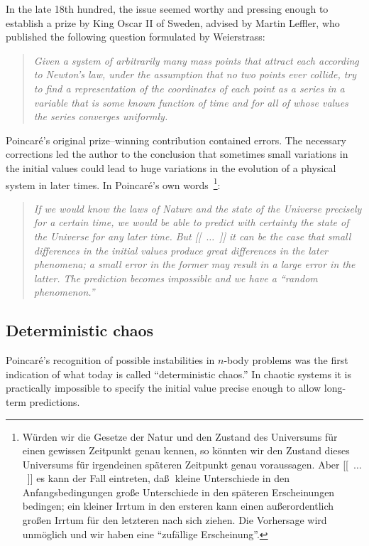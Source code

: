 \documentclass[rmp,amsfonts,showpacs,showkeys,twocolumn]{revtex4}
\begin{document}
In the late 18th hundred,
the issue seemed worthy and pressing enough to establish a prize by
King Oscar II of Sweden, advised by Martin Leffler, who published the following
question formulated by Weierstrass:
\begin{quote}
{\em
Given a system of arbitrarily many mass points that attract each
according to Newton's law, under the assumption that no two points ever collide,
try to find a representation of the coordinates of each point
as a series in a variable that is some known function of time and for
all of whose values the series converges uniformly.
}
\end{quote}
Poincar{\'e}'s original prize--winning contribution contained errors.
The necessary corrections led the author to the conclusion that sometimes small
variations in the initial values could lead to huge variations in the
evolution of a physical system in later times.
In Poincar{\'e}'s own words~\cite[Chapter 4, Sect. II, pp. 56-57]{poincare14}\footnote{
W\"urden wir die Gesetze der Natur und den Zustand des Universums
f\"ur einen gewissen Zeitpunkt genau kennen, so
k\"onnten wir den Zustand dieses Universums f\"ur
irgendeinen sp\"ateren Zeitpunkt genau voraussagen.
Aber
[[~$\ldots$~]]
 es kann der Fall eintreten,
da\ss $\;$ kleine Unterschiede in den Anfangsbedingungen
gro\ss e Unterschiede in den sp\"ateren Erscheinungen bedingen;
ein kleiner Irrtum in den ersteren kann einen au\ss erordentlich gro\ss en
Irrtum f\"ur den letzteren nach sich ziehen.
Die Vorhersage wird unm\"oglich und wir haben eine
``zuf\"allige Erscheinung''.}:
\begin{quote}
{\em
If we would know the laws of Nature and the state of the Universe precisely
for a certain time,
we would be able to predict with certainty
the state of the Universe for any later time.
But
[[~$\ldots$~]]
it can be the case that small differences in the initial values
produce great differences in the later phenomena;
a small error in the former may result in a large error in the latter.
The prediction becomes impossible and we have a ``random phenomenon.''}
\end{quote}

\subsection{Deterministic chaos}

Poincar{\'e}'s recognition of possible instabilities
in $n$-body problems was the first indication of what today is called ``deterministic chaos.''
In chaotic systems it is practically impossible to specify
the initial value precise enough to allow long-term predictions.
\end{document}
